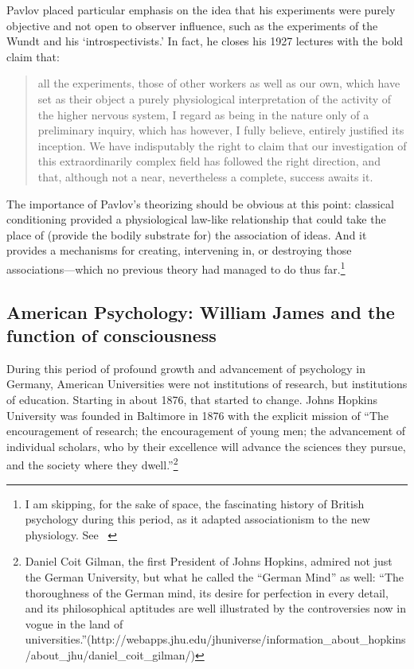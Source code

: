 \begin{refsection}
Pavlov placed particular emphasis on the idea that his experiments were purely objective and not open to observer influence, such as the experiments of the Wundt and his `introspectivists.' In fact, he closes his 1927 lectures with the bold claim that:

\begin{quote}

all the experiments, those of other workers as well as our own, which have set as their object a purely physiological interpretation of the activity of the higher nervous system, I regard as being in the nature only of a preliminary inquiry, which has however, I fully believe, entirely justified its inception. We have indisputably the right to claim that our investigation of this extraordinarily complex field has followed the right direction, and that, although not a near, nevertheless a complete, success awaits it. ~\citep{Pavlov:1946ws}
\end{quote}

The importance of Pavlov's theorizing should be obvious at this point: classical conditioning provided a physiological law-like relationship that could take the place of (provide the bodily substrate for) the association of ideas. And it provides a mechanisms for creating, intervening in, or destroying those associations---which no previous theory had managed to do thus far.\footnote{I am skipping, for the sake of space, the fascinating history of British psychology during this period, as it adapted associationism to the new physiology. See ~\citep{Daston:1978vx}}

\subsection{American Psychology: William James and the function of consciousness}
\label{americanpsychology:williamjamesandthefunctionofconsciousness}

During this period of profound growth and advancement of psychology in Germany, American Universities were not institutions of research, but institutions of education. Starting in about 1876, that started to change. Johns Hopkins University was founded in Baltimore in 1876 with the explicit mission of ``The encouragement of research; the encouragement of young men; the advancement of individual scholars, who by their excellence will advance the sciences they pursue, and the society where they dwell.''\footnote{Daniel Coit Gilman, the first President of Johns Hopkins, admired not just the German University, but what he called the ``German Mind'' as well: ``The thoroughness of the German mind, its desire for perfection in every detail, and its philosophical aptitudes are well illustrated by the controversies now in vogue in the land of universities.''(http:\slash \slash webapps.jhu.edu\slash jhuniverse\slash information\_about\_hopkins\slash about\_jhu\slash daniel\_coit\_gilman\slash )} 


\end{refsection}
